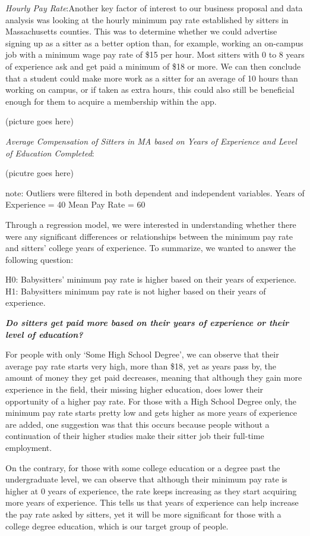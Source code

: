 \documentclass[12pt]{article}
\begin{document}
\emph{Hourly Pay Rate}:Another key factor of interest to our business
proposal and data analysis was looking at the hourly minimum pay rate
established by sitters in Massachusetts counties. This was to determine
whether we could advertise signing up as a sitter as a better option
than, for example, working an on-campus job with a minimum wage pay rate
of \$15 per hour. Most sitters with 0 to 8 years of experience ask and
get paid a minimum of \$18 or more. We can then conclude that a student
could make more work as a sitter for an average of 10 hours than working
on campus, or if taken as extra hours, this could also still be
beneficial enough for them to acquire a membership within the app.

(picture goes here)

\emph{Average Compensation of Sitters in MA based on Years of Experience
and Level of Education Completed}:

(picutre goes here)

note: Outliers were filtered in both dependent and independent
variables. Years of Experience = 40 Mean Pay Rate = 60

Through a regression model, we were interested in understanding whether
there were any significant differences or relationships between the
minimum pay rate and sitters' college years of experience. To summarize,
we wanted to answer the following question:

H0: Babysitters' minimum pay rate is higher based on their years of
experience. H1: Babysitters minimum pay rate is not higher based on
their years of experience.

\textbf{\emph{Do sitters get paid more based on their years of
experience or their level of education?}}

For people with only `Some High School Degree', we can observe that
their average pay rate starts very high, more than \$18, yet as years
pass by, the amount of money they get paid decreases, meaning that
although they gain more experience in the field, their missing higher
education, does lower their opportunity of a higher pay rate. For those
with a High School Degree only, the minimum pay rate starts pretty low
and gets higher as more years of experience are added, one suggestion
was that this occurs because people without a continuation of their
higher studies make their sitter job their full-time employment.

On the contrary, for those with some college education or a degree past
the undergraduate level, we can observe that although their minimum pay
rate is higher at 0 years of experience, the rate keeps increasing as
they start acquiring more years of experience. This tells us that years
of experience can help increase the pay rate asked by sitters, yet it
will be more significant for those with a college degree education,
which is our target group of people.
\end{document}
